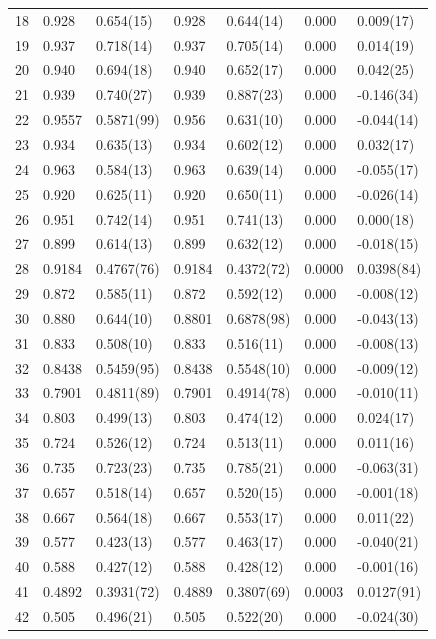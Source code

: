 \documentclass[aps, prc, tightenlines,superscriptaddress, letterpaper, amsmath, amssymb, preprintnumbers, floatfix, longbibliography, nofootinbib]{revtex4-2}
\begin{document}
\begin{table}[!htb]
{\begin{tabularx}{\textwidth}{| c || Y | Y | Y | Y | Y | Y |}
18	&	0.928	&	0.654(15)	&	0.928	&	0.644(14)	&	0.000	&	0.009(17)	\\
19	&	0.937	&	0.718(14)	&	0.937	&	0.705(14)	&	0.000	&	0.014(19)	\\
20	&	0.940	&	0.694(18)	&	0.940	&	0.652(17)	&	0.000	&	0.042(25)	\\
21	&	0.939	&	0.740(27)	&	0.939	&	0.887(23)	&	0.000	&	-0.146(34)	\\
22	&	0.9557	&	0.5871(99)	&	0.956	&	0.631(10)	&	0.000	&	-0.044(14)	\\
23	&	0.934	&	0.635(13)	&	0.934	&	0.602(12)	&	0.000	&	0.032(17)	\\
24	&	0.963	&	0.584(13)	&	0.963	&	0.639(14)	&	0.000	&	-0.055(17)	\\
25	&	0.920	&	0.625(11)	&	0.920	&	0.650(11)	&	0.000	&	-0.026(14)	\\
26	&	0.951	&	0.742(14)	&	0.951	&	0.741(13)	&	0.000	&	0.000(18)	\\
27	&	0.899	&	0.614(13)	&	0.899	&	0.632(12)	&	0.000	&	-0.018(15)	\\
28	&	0.9184	&	0.4767(76)	&	0.9184	&	0.4372(72)	&	0.0000	&	0.0398(84)	\\
29	&	0.872	&	0.585(11)	&	0.872	&	0.592(12)	&	0.000	&	-0.008(12)	\\
30	&	0.880	&	0.644(10)	&	0.8801	&	0.6878(98)	&	0.000	&	-0.043(13)	\\
31	&	0.833	&	0.508(10)	&	0.833	&	0.516(11)	&	0.000	&	-0.008(13)	\\
32	&	0.8438	&	0.5459(95)	&	0.8438	&	0.5548(10)	&	0.000	&	-0.009(12)	\\
33	&	0.7901	&	0.4811(89)	&	0.7901	&	0.4914(78)	&	0.000	&	-0.010(11)	\\
34	&	0.803	&	0.499(13)	&	0.803	&	0.474(12)	&	0.000	&	0.024(17)	\\
35	&	0.724	&	0.526(12)	&	0.724	&	0.513(11)	&	0.000	&	0.011(16)	\\
36	&	0.735	&	0.723(23)	&	0.735	&	0.785(21)	&	0.000	&	-0.063(31)	\\
37	&	0.657	&	0.518(14)	&	0.657	&	0.520(15)	&	0.000	&	-0.001(18)	\\
38	&	0.667	&	0.564(18)	&	0.667	&	0.553(17)	&	0.000	&	0.011(22)	\\
39	&	0.577	&	0.423(13)	&	0.577	&	0.463(17)	&	0.000	&	-0.040(21)	\\
40	&	0.588	&	0.427(12)	&	0.588	&	0.428(12)	&	0.000	&	-0.001(16)	\\
41	&	0.4892	&	0.3931(72)	&	0.4889	&	0.3807(69)	&	0.0003	&	0.0127(91)	\\
42	&	0.505	&	0.496(21)	&	0.505	&	0.522(20)	&	0.000	&	-0.024(30)	\\

\end{tabularx}}
\end{table}
\end{document}
